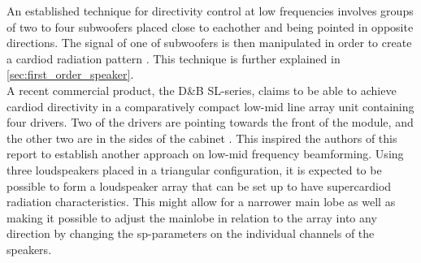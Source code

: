An established technique for directivity control at low frequencies involves groups of two to four subwoofers placed close to eachother and being pointed in opposite directions. The signal of one of subwoofers is then manipulated in order to create a cardiod radiation pattern \citep{KS28}. This technique is further explained in \autoref{sec:first_order_speaker}.\\
A recent commercial product, the D\&B SL-series, claims to be able to achieve cardiod directivity in a comparatively compact low-mid line array unit containing four drivers. Two of the drivers are pointing towards the front of the module, and the other two are in the sides of the cabinet \citep{SL_GSL}. This inspired the authors of this report to establish another approach on low-mid frequency beamforming. Using three loudspeakers placed in a triangular configuration, it is expected to be possible to form a loudspeaker array that can be set up to have supercardiod radiation characteristics. This might allow for a narrower main lobe as well as making it possible to adjust the mainlobe in relation to the array into any direction by changing the \gls{sp}-parameters on the individual channels of the speakers.






